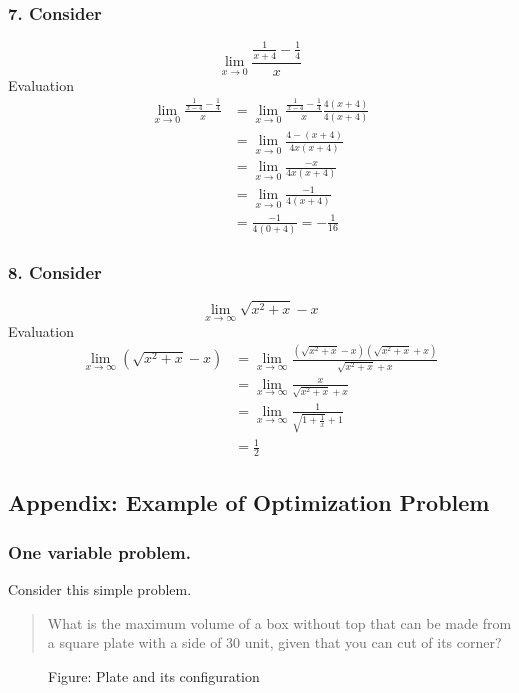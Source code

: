 \documentclass[../../../main.tex]{subfiles}
\begin{document}
\subsubsection{7. Consider}
\begin{equation*}
    \lim_{x\to0}\frac{\frac{1 }{x+4 }-\frac{1 }{4}  }{x}
\end{equation*}
Evaluation
\begin{align*}
\lim_{x \to 0} \frac{\tfrac{1}{x - 4} - \tfrac{1}{4}}{x}
&=\lim_{x \to 0}\frac{\frac{1 }{x-4 }-\frac{1 }{4}  }{x} \frac{4(x+4 )}{4(x+4)}\\
&= \lim_{x \to 0}\frac{4-(x+4 )}{4x(x+4)}\\
&= \lim_{x \to 0} \frac{-x }{4x(x+4)}\\
&= \lim_{x \to 0} \frac{-1 }{4(x+4)}\\
&= \frac{-1 }{4(0+4)}=-\frac{1 }{16}
\end{align*}

\subsubsection{8. Consider}
\begin{equation*}
    \lim_{x\to\infty}\sqrt{x^2+x}-x
\end{equation*}
Evaluation
\begin{align*}
\lim_{x \to \infty} (\sqrt{x^{2} + x} - x)
&= \lim_{x \to \infty} \frac{(\sqrt{x^{2} + x} - x)(\sqrt{x^{2} + x} + x)}{\sqrt{x^{2} + x} + x} \\
&= \lim_{x \to \infty} \frac{x}{\sqrt{x^{2} + x} + x} \\
&= \lim_{x \to \infty} \frac{1}{\sqrt{1 + \tfrac{1}{x}} + 1} \\
&= \frac{1}{2}
\end{align*}

\subsection{Appendix: Example of Optimization Problem}
\subsubsection{One variable problem.} Consider this simple problem.
\begin{quotation}
    What is the maximum volume of a box without top that can be made from a square plate with a side of 30 unit, given that you can cut of its corner?
\end{quotation}
\begin{figure*}[b]
    \centering
    \caption*{Figure: Plate and its configuration}
\end{figure*}
\end{document}
